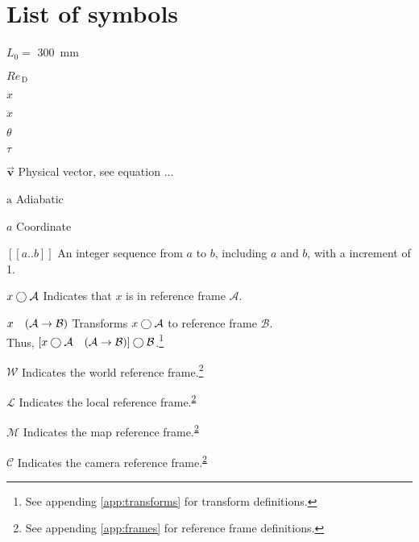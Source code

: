 \chapter{List of symbols}

\begin{Nomencl}[1cm]
    \item[$L_0 = $] \qty{300}{mm}

    \item[$\mathit{Re}_\mathrm{\,D}$]
    \item[$x$]         
    \item[$\ddot{x}$]  \\
    
    \item[$\theta$]    
    \item[$\tau$]      

    \item[$\overrightarrow{\bm{v}}$] Physical vector, see equation ...

    \item[$\mathrm{a}$] Adiabatic
    \item[$a$]          Coordinate

    \item[{\([\![a..b]\!]\)}] An integer sequence from \(a\) to \(b\), including \(a\) and \(b\), with a increment of 1.
    \item[\(x\bigcirc\mathcal{A}\)] Indicates that \(x\) is in reference frame \(\mathcal{A}\).
    \item[\(x\transframe{A}{B}\)] Transforms \(x\bigcirc\mathcal{A}\) to reference frame \(\mathcal{B}\).\\
    \hspace{0.5cm} Thus, \(\left[x\inrefframe{A}\transframe{A}{B}\right]\inrefframe{B}\).\footnote{See appending \ref{app:transforms} for transform definitions.}
    \item[\(\mathcal{W}\)] Indicates the world reference frame.\footnote{\label{note1}See appending \ref{app:frames} for reference frame definitions.}
    \item[\(\mathcal{L}\)] Indicates the local reference frame.\textsuperscript{\ref{note1}}
    \item[\(\mathcal{M}\)] Indicates the map reference frame.\textsuperscript{\ref{note1}}
    \item[\(\mathcal{C}\)] Indicates the camera reference frame.\textsuperscript{\ref{note1}}
    
\end{Nomencl}

